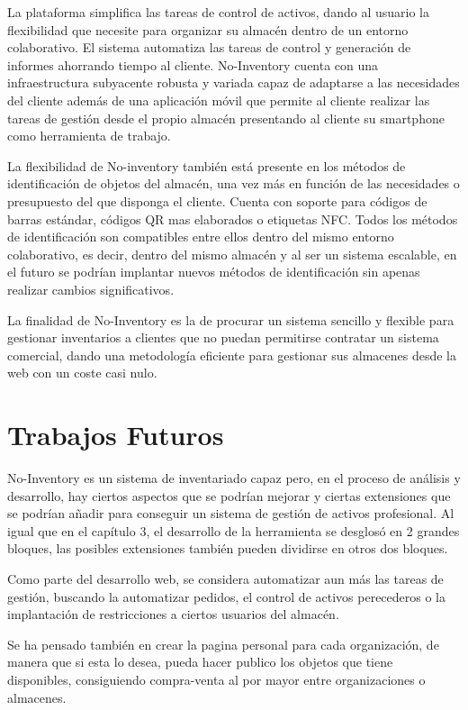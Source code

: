 \documentclass[a4paper,11pt]{book}
\begin{document}
La plataforma simplifica las tareas de control de activos, dando al usuario la flexibilidad que necesite para organizar su almacén dentro de un entorno colaborativo. El sistema automatiza las tareas de control y generación de informes  ahorrando tiempo al cliente. No-Inventory cuenta con una infraestructura subyacente robusta y variada capaz de adaptarse a las necesidades del cliente además de una aplicación móvil que permite al cliente realizar las tareas de gestión desde el propio almacén presentando al cliente su smartphone como herramienta de trabajo. 

La flexibilidad de No-inventory también está presente en los métodos de identificación  de objetos del almacén, una vez más en función de las necesidades o presupuesto del que disponga el cliente. Cuenta con soporte para códigos de barras estándar, códigos QR mas elaborados o etiquetas NFC. Todos los métodos de identificación son compatibles entre ellos dentro del mismo entorno colaborativo, es decir, dentro del mismo almacén y al ser un sistema escalable, en el futuro se podrían implantar nuevos métodos de identificación sin apenas realizar cambios significativos.

La finalidad de No-Inventory es la de procurar un sistema sencillo y flexible para gestionar inventarios  a clientes que no puedan permitirse contratar un sistema comercial, dando una metodología eficiente para gestionar sus almacenes desde la web con un coste casi nulo. 


 

 

\section{Trabajos Futuros}
No-Inventory es un sistema de inventariado capaz pero, en el proceso de análisis y desarrollo, hay ciertos aspectos que se podrían mejorar y ciertas extensiones que se podrían añadir para conseguir un sistema de gestión de activos profesional. Al igual que en el capítulo 3, el desarrollo de la herramienta se desglosó en 2 grandes bloques, las posibles extensiones también pueden dividirse en otros dos bloques. 


Como parte del desarrollo web, se considera automatizar aun más las tareas de gestión, buscando la automatizar pedidos, el control de activos perecederos o la implantación de restricciones a ciertos usuarios del almacén.

Se ha pensado también en crear la pagina personal para cada organización, de manera que si esta lo desea, pueda hacer publico los objetos que tiene disponibles, consiguiendo compra-venta al por mayor entre organizaciones o almacenes. 
	
\end{document}
